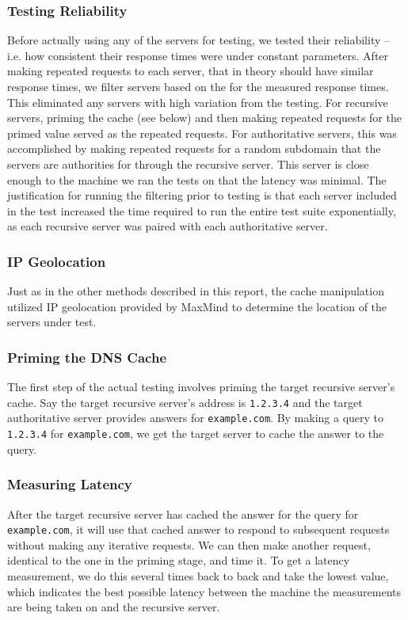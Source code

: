\subsubsection{Testing Reliability}

Before actually using any of the servers for testing, we tested their reliability -- i.e. how consistent their response times were under constant parameters. After making repeated requests to each server, that in theory should have similar response times, we filter servers based on the \cv for the measured response times. This eliminated any servers with high variation from the testing. For recursive servers, priming the cache (see below) and then making repeated requests for the primed value served as the repeated requests. For authoritative servers, this was accomplished by making repeated requests for a random subdomain that the servers are authorities for through the \wpi recursive \dns server. This server is close enough to the machine we ran the tests on that the latency was minimal. The justification for running the filtering prior to testing is that each server included in the test increased the time required to run the entire test suite exponentially, as each recursive server was paired with each authoritative server.

\subsubsection{IP Geolocation}
Just as in the other methods described in this report, the \dns cache manipulation utilized IP geolocation provided by MaxMind to determine the location of the servers under test.

\subsubsection{Priming the DNS Cache} 
The first step of the actual testing involves priming the target recursive server's cache. Say the target recursive server's \ip address is \texttt{1.2.3.4} and the target authoritative server provides answers for \texttt{example.com}. By making a \dns query to \texttt{1.2.3.4} for \texttt{example.com}, we get the target \dns server to cache the answer to the query.

\subsubsection{Measuring Latency} 
After the target recursive server has cached the answer for the query for \texttt{example.com}, it will use that cached answer to respond to subsequent requests without making any iterative requests. We can then make another request, identical to the one in the priming stage, and time it. To get a latency measurement, we do this several times back to back and take the lowest value, which indicates the best possible latency between the machine the measurements are being taken on and the recursive server.

